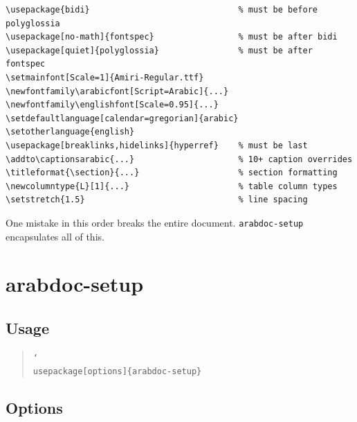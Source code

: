 \documentclass[11pt,a4paper]{ltxdoc}
\newcommand{\pkg}[1]{\texttt{#1}}
\begin{document}
\begin{english}\begin{verbatim}
\usepackage{bidi}                              % must be before polyglossia
\usepackage[no-math]{fontspec}                 % must be after bidi
\usepackage[quiet]{polyglossia}                % must be after fontspec
\setmainfont[Scale=1]{Amiri-Regular.ttf}
\newfontfamily\arabicfont[Script=Arabic]{...}
\newfontfamily\englishfont[Scale=0.95]{...}
\setdefaultlanguage[calendar=gregorian]{arabic}
\setotherlanguage{english}
\usepackage[breaklinks,hidelinks]{hyperref}    % must be last
\addto\captionsarabic{...}                     % 10+ caption overrides
\titleformat{\section}{...}                    % section formatting
\newcolumntype{L}[1]{...}                      % table column types
\setstretch{1.5}                               % line spacing
\end{verbatim}\end{english}

One mistake in this order breaks the entire document. \pkg{arabdoc-setup} encapsulates all of this.

\section{arabdoc-setup}

\subsection{Usage}

\begin{quote}
\texttt{\char`\\usepackage[options]\{arabdoc-setup\}}
\end{quote}

\subsection{Options}
\end{document}
